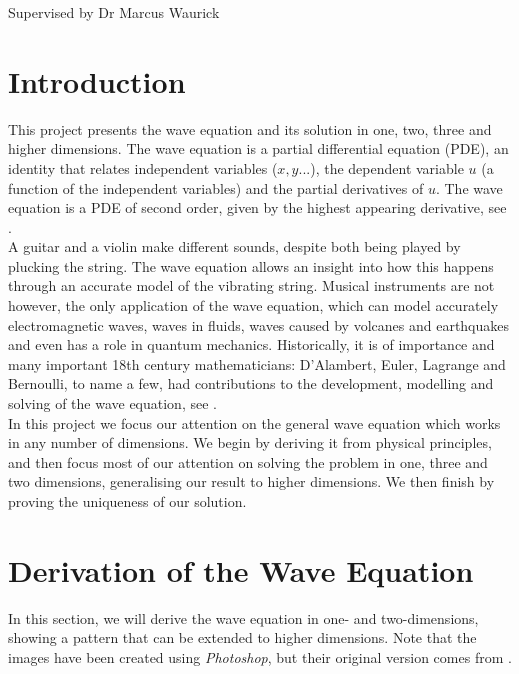 \documentclass[a4paper, 12pt]{article}
\numberwithin{equation}{section}
\begin{document}
    \vspace*{5cm}
    Supervised by Dr Marcus Waurick
    \newpage
    \normalsize
    \tableofcontents
    \newpage
    
\section{Introduction}
This project presents the wave equation and its solution in one, two, three and higher dimensions. The wave equation is a partial differential equation (PDE), an identity
that relates independent variables ($x, y...$), the dependent variable $u$ (a function of the independent variables) and the partial derivatives of $u$. The wave 
equation is a PDE of second order, given by the highest appearing derivative, see \cite{Fol}.
\\

A guitar and a violin make different sounds, despite both being played by plucking the string. The wave equation allows an insight into how this happens through an
accurate model of the vibrating string. Musical instruments are not however, the  only application of the wave equation, which can model accurately electromagnetic 
waves, waves in fluids, waves caused by volcanes and earthquakes and even has a role in quantum mechanics. Historically, it is of importance and many important 18th century
mathematicians: D'Alambert, Euler, Lagrange and Bernoulli, to name a few, had contributions to the development, modelling and solving of the wave equation, see \cite{Coc}.
\\

In this project we focus our attention on the general wave equation which works in any number of dimensions. We begin by deriving it from physical principles, and then 
focus most of our attention on solving the problem in one, three and two dimensions, generalising our result to higher dimensions. We then finish by proving the uniqueness 
of our solution.

\section{Derivation of the Wave Equation}
In this section, we will derive the wave equation in one- and two-dimensions, showing a pattern that 
can be extended to higher dimensions. Note that the images have been created using \emph{Photoshop}, but their original version comes from \cite{Kr}.
\end{document}
